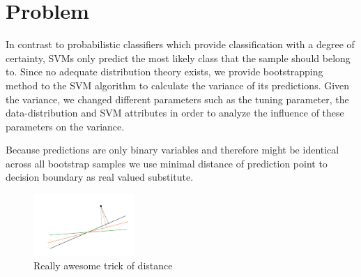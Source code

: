 \documentclass[letterpaper]{article}
\begin{document}
 


\section{Problem}
  In contrast to probabilistic classifiers which provide classification with a degree of certainty, SVMs only predict the most likely class that the sample should belong to.  
Since no adequate distribution theory exists, we provide bootstrapping method to the SVM algorithm to calculate the variance of its predictions. Given the variance, we changed different parameters such as
the tuning parameter, the data-distribution and SVM attributes in order to analyze the influence of these parameters on the variance.

Because predictions are only binary variables and therefore might be identical across all bootstrap samples we use minimal distance of prediction point to decision boundary as real valued substitute. 



\begin{figure}[!htb]
\begin{center}
\includegraphics[width=1.5in]{abb/distances.jpg}
\caption{Really awesome trick of distance}
\label{fig1}
\end{center}
\end{figure}
\end{document}
